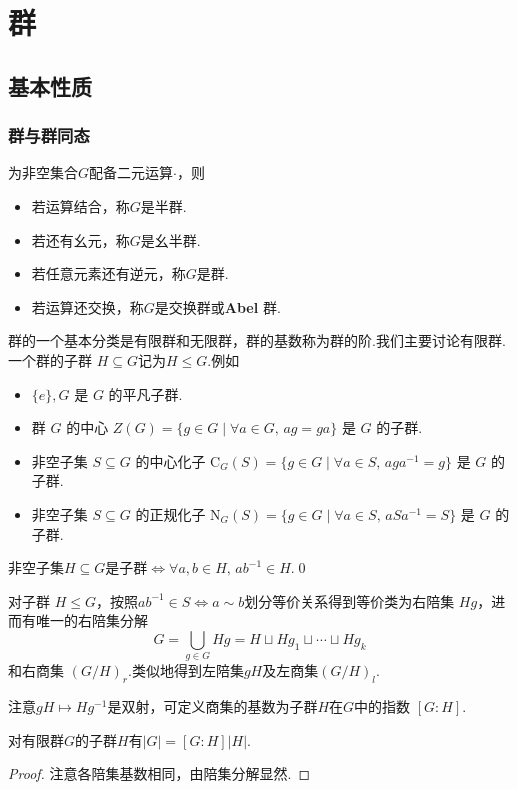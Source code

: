 \chapter{群}
\section{基本性质}
\subsection{群与群同态}
\begin{definition}
	为非空集合$G$配备二元运算$\cdot$，则
	\begin{itemize}
		\item 若运算结合，称$G$是{\heiti 半群}.
		\item 若还有幺元，称$G$是{\heiti 幺半群}.
		\item 若任意元素还有逆元，称$G$是{\heiti 群}.
		\item 若运算还交换，称$G$是{\heiti 交换群}或{\heiti \textbf{Abel} 群}.
	\end{itemize}
\end{definition}

群的一个基本分类是有限群和无限群，群的基数称为群的{\heiti 阶}.我们主要讨论有限群.一个群的{\heiti 子群} $H\subseteq G$记为$H\le G$.例如
\begin{itemize}
	\item $\{e\},G$ 是 $G$ 的平凡子群.
	\item 群 $G$ 的{\heiti 中心} $Z(G)=\{g\in G\mid \forall a\in G,\,ag=ga\}$ 是 $G$ 的子群.
	\item 非空子集 $S\subseteq G$ 的{\heiti 中心化子} $\mathrm C_G(S)=\{g\in G\mid \forall a\in S,\,aga^{-1}=g\}$ 是 $G$ 的子群.
	\item 非空子集 $S\subseteq G$ 的{\heiti 正规化子} $\mathrm N_G(S)=\{g\in G\mid \forall a\in S,\,aSa^{-1}=S\}$ 是 $G$ 的子群.
\end{itemize}

\begin{lemma}
	非空子集$H\subseteq G$是子群$\iff$$\forall a,b\in H,\,ab^{-1}\in H$.\qed
\end{lemma}

对子群 $H\le G$，按照$ab^{-1}\in S\Leftrightarrow a\sim b$划分等价关系得到等价类为{\heiti 右陪集} $Hg$，进而有唯一的{\heiti 右陪集分解}
\[
	G=\bigcup_{g\in G}Hg=H\sqcup Hg_1\sqcup\cdots\sqcup Hg_k
\]
和{\heiti 右商集} $(G/H)_r$.类似地得到左陪集$gH$及左商集$(G/H)_l$.

注意$gH\mapsto Hg^{-1}$是双射，可定义商集的基数为子群$H$在$G$中的{\heiti 指数} $[G:H]$.
\begin{thm}[(Lagrange)]
	对有限群$G$的子群$H$有$|G|=[G:H]|H|$.
\end{thm}
\begin{proof}
	注意各陪集基数相同，由陪集分解显然.
\end{proof}

